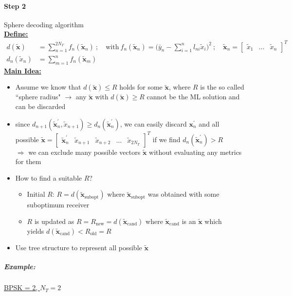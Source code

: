 \documentclass[a4paper, 10pt]{article}
\begin{document}
\paragraph*{Step 2}
Sphere decoding algorithm\\ 
\underline{\textbf{Define:}}
\begin{align*}
	 d(\tilde{\mathbf{x}}) &= \sum_{n = 1}^{2N_T} f_n(\tilde{\mathbf{x}}_n) \ ;\quad \text{with}\ f_n(\tilde{\mathbf{x}}_n) = \bigl (\bar{y}_n - \sum_{i = 1}^{n}l_{ni}\tilde{x}_i\bigr)^2\ ;\quad \tilde{\mathbf{x}}_n = 
	 \begin{bmatrix}
	 	\tilde{x}_1 & \ldots & \tilde{x}_n
	 \end{bmatrix}^T \\
	 d_n(\tilde{x}_n) &= \sum_{m = 1}^{n} f_n(\tilde{\mathbf{x}}_m)
\end{align*}
\underline{\textbf{Main Idea:}}
\begin{itemize}
	\item Assume we know that $ d(\tilde{\mathbf{x}}) \leq R $ holds for some $\tilde{\mathbf{x}} $, where $ R $ is the so called ``sphere radius" \quad	$\rightarrow$ any $ \tilde{\mathbf{x}} $ with $ d(\tilde{\mathbf{x}}) \geq R $ cannot be the ML solution and can be discarded
	\item since $ d_{n + 1}(\tilde{\mathbf{x}}_n^\prime, \tilde{x}_{n + 1}) \geq d_n(\tilde{\mathbf{x}}_n^\prime) $, we can easily discard $ \mathbf{x}_n^\prime $ and all \\ possible $ \tilde{\mathbf{x}} = \begin{bmatrix}
	\tilde{\mathbf{x}}_n^{\prime} & \tilde{x}_{n+1} & \tilde{x}_{n+2} & \ldots & \tilde{x}_{2N_T} \end{bmatrix}^T $ if we find $ d_n(\tilde{\mathbf{x}}_n^\prime) > R \quad $ \\ $ \Rightarrow $ we can exclude many possible vectors $\tilde{\mathbf{x}} $ without evaluating  any metrics for them 
	\item How to find a suitable $R$?
	\begin{itemize}
		\item Initial $R$: $R = d(\tilde{\mathbf{x}}_{\text{subopt}}) $ where $ \tilde{\mathbf{x}}_{\text{subopt}} $ was obtained with some suboptimum receiver
		\item $R $ is updated as $ R = R_{\text{new}} = d(\tilde{\mathbf{x}}_{\text{cand}}) $ where $ \tilde{\mathbf{x}}_{\text{cand}} $ is an $ \tilde{\mathbf{x}} $ which \\ yields  $ d(\tilde{\mathbf{x}}_{\text{cand}}) < R_{\text{old}} = R $
	\end{itemize}
	\item Use tree structure to represent all possible $\tilde{\mathbf{x}} $ 
\end{itemize}
\subparagraph*{Example:}	
\underline{ BPSK = 2, $N_T = 2$}\\
\end{document}
